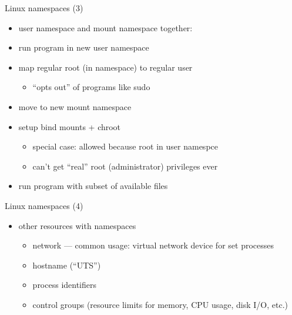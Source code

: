 \begin{frame}{Linux namespaces (3)}
    \begin{itemize}
    \item user namespace and mount namespace together:
    \vspace{.5cm}
    \item run program in new user namespace
    \item map regular root (in namespace) to regular user
        \begin{itemize}
        \item ``opts out'' of programs like sudo
        \end{itemize}
    \item move to new mount namespace
    \item setup bind mounts + chroot
        \begin{itemize}
        \item special case: allowed because root in user namespce
        \item can't get ``real'' root (administrator) privileges ever
        \end{itemize}
    \item run program with subset of available files
    \end{itemize}
\end{frame}

\begin{frame}{Linux namespaces (4)}
    \begin{itemize}
    \item other resources with namespaces
        \begin{itemize}
        \item network --- common usage: virtual network device for set processes
        \item hostname (``UTS'')
        \item process identifiers
        \item control groups (resource limits for memory, CPU usage, disk I/O, etc.)
        \end{itemize}
    \end{itemize}
\end{frame}
